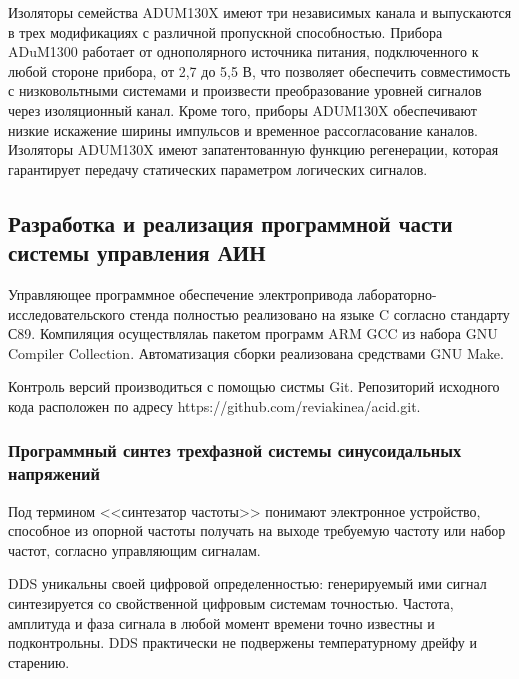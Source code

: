         Изоляторы семейства ADUM130X имеют три независимых канала и выпускаются
        в трех модификациях с различной пропускной способностью. Прибора
        ADuM1300 работает от однополярного источника питания, подключенного к
        любой стороне прибора, от 2,7 до 5,5 В, что позволяет обеспечить
        совместимость с низковольтными системами и произвести преобразование
        уровней сигналов через изоляционный канал. Кроме того, приборы ADUM130X
        обеспечивают низкие искажение ширины импульсов и временное
        рассогласование каналов.  Изоляторы ADUM130X имеют запатентованную
        функцию регенерации, которая гарантирует передачу статических
        параметром логических сигналов.

    \subsection{Разработка и реализация программной части системы управления АИН}
        Управляющее программное обеспечение электропривода
        лабораторно-исследовательского стенда полностью реализовано на языке C
        согласно стандарту С89. Компиляция осуществлялаь пакетом программ ARM
        GCC из набора GNU Compiler Collection. Автоматизация сборки реализована
        средствами GNU Make.

        Контроль версий производиться с помощью систмы Git. Репозиторий
        исходного кода расположен по адресу
        https://github.com/reviakinea/acid.git.

    \subsubsection{Программный синтез трехфазной системы синусоидальных напряжений}
        Под термином <<синтезатор частоты>> понимают электронное устройство,
        способное из опорной частоты получать на выходе требуемую частоту или
        набор частот,  согласно управляющим сигналам.

        DDS  уникальны своей цифровой определенностью:  генерируемый ими сигнал
        синтезируется со свойственной цифровым системам точностью.  Частота,
        амплитуда и фаза сигнала в любой момент времени точно известны и
        подконтрольны. DDS  практически не подвержены температурному дрейфу и
        старению.

